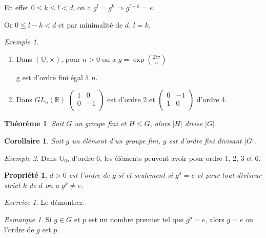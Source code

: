 \documentclass[]{article}
\newtheorem{mythm}{Théorème}
\newtheorem{myproperty}{Propriété}
\newtheorem{mycor}{Corollaire}
\theoremstyle{remark}
\newtheorem{myrem}{Remarque}
\newtheorem{myexer}{Exercice}
\newtheorem{myexmpl}{Exemple}
\theoremstyle{definition}
\begin{document}
En effet $0 \leqslant k \leqslant l < d$, on a $g^l=g^k \Longrightarrow g^{l-k}=e$.

Or $0 \leqslant l - k < d$ et par minimalité de $d$, $l=k$.

\begin{myexmpl}
	\leavevmode
	\begin{enumerate}
		\item Dans $(\mathbb{U}, \times)$, pour $n > 0$ on a $g=\exp\left(\frac{2i \pi}{n}\right)$
		
		g est d'ordre fini égal à $n$.
		
		\item Dans $GL_n(\mathbb{R})$ $\left(\begin{array}{cc}
			1 & 0 \\
			0 & -1 \\
		\end{array}\right)$ est d'ordre 2 et $\left(\begin{array}{cc}
					0 & -1 \\
					1 & 0 \\
				\end{array}\right)$ d'ordre 4.
	\end{enumerate}
\end{myexmpl}

\begin{mythm}
	Soit $G$ un groupe fini et $H \leqslant G$, alors $|H|$ divise  $|G|$. 
\end{mythm}

\begin{mycor}
	Soit $g$ un élément d'un groupe fini, $g$ est d'ordre fini divisant $|G|$.
\end{mycor}

\begin{myexmpl}
	Dans $\mathbb{U}_6$, d'ordre 6, les éléments peuvent avoir pour ordre 1, 2, 3 et 6.
\end{myexmpl}

\begin{myproperty}
	$d > 0$ est l'ordre de $g$ si et seulement si $g^d=e$ et pour tout diviseur strict $k$ de $d$ on a $g^k \neq e$.
\end{myproperty}

\begin{myexer}
	Le démontrer.
\end{myexer}

\begin{myrem}
	Si $g \in G$ et $p$ est un nombre premier tel que $g^p=e$, alors $g=e$ ou l'ordre de $g$ est $p$.
\end{myrem}
\end{document}
